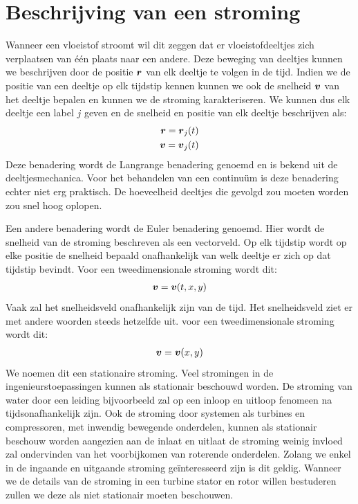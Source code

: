 	\section{Beschrijving van een stroming}
	\label{sec:Beschrijving van een stroming}
Wanneer een vloeistof stroomt wil dit zeggen dat er vloeistofdeeltjes zich verplaatsen van één plaats naar een andere. Deze beweging van deeltjes kunnen we beschrijven door de positie $\boldsymbol{r}$ van elk deeltje te volgen in de tijd. Indien we de positie van een deeltje op elk tijdstip kennen kunnen we ook de snelheid $\boldsymbol{v}$ van het deeltje bepalen en kunnen we de stroming karakteriseren. We kunnen dus elk deeltje een label $j$ geven en de snelheid en positie van elk deeltje beschrijven als:
\begin{eqnarray}
	\boldsymbol{r} = \boldsymbol{r}_j(t) \\
	\boldsymbol{v} = \boldsymbol{v}_j(t)
\end{eqnarray}
Deze benadering wordt de Langrange benadering genoemd en is bekend uit de deeltjesmechanica. Voor het behandelen van een continuüm is deze benadering echter niet erg praktisch. De hoeveelheid deeltjes die gevolgd zou moeten worden zou snel hoog oplopen.

Een andere benadering wordt de Euler benadering genoemd. Hier wordt de snelheid van de stroming beschreven als een vectorveld. Op elk tijdstip wordt op elke positie de snelheid bepaald onafhankelijk van welk deeltje er zich op dat tijdstip bevindt. Voor een tweedimensionale stroming wordt dit:
\begin{eqnarray}
	\boldsymbol{v} = \boldsymbol{v}(t,x,y)
\end{eqnarray}
Vaak zal het snelheidsveld onafhankelijk zijn van de tijd. Het snelheidsveld ziet er met andere woorden steeds hetzelfde uit. voor een tweedimensionale stroming wordt dit: 
\begin{eqnarray}
	\boldsymbol{v} = \boldsymbol{v}(x,y)
\end{eqnarray}
We noemen dit een stationaire stroming. Veel stromingen in de ingenieurstoepassingen kunnen als stationair beschouwd worden. De stroming van water door een leiding bijvoorbeeld zal op een inloop en uitloop fenomeen na tijdsonafhankelijk zijn. Ook de stroming door systemen als turbines en compressoren, met inwendig bewegende onderdelen, kunnen als stationair beschouw worden aangezien aan de inlaat en uitlaat de stroming weinig invloed zal ondervinden van het voorbijkomen van roterende onderdelen. Zolang we enkel in de ingaande en uitgaande stroming geïnteresseerd zijn is dit geldig. Wanneer we de details van de stroming in een turbine stator en rotor willen bestuderen zullen we deze als niet stationair moeten beschouwen.

